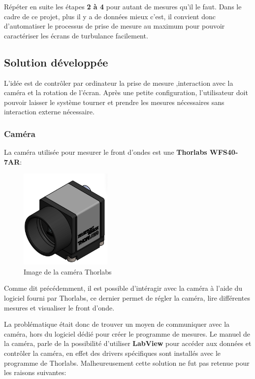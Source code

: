 Répéter en suite les étapes \textbf{2 à 4} pour autant de mesures qu'il le faut.
Dans le cadre de ce projet, plus il y a de données mieux c'est, il convient donc d'automatiser le
processus de prise de mesure au maximum pour pouvoir caractériser les écrans de turbulance facilement.

\subsection{Solution développée}
L'idée est de contrôler par ordinateur la prise de mesure ,interaction avec la caméra et la rotation de l'écran.
Après une petite configuration, l'utilisateur doit pouvoir laisser le système tourner et prendre les mesures nécessaires sans
interaction externe nécessaire.

\subsubsection{Caméra}

La caméra utilisée pour mesurer le front d'ondes est une \textbf{Thorlabs WFS40-7AR}:
\begin{figure}[H]
    \centering
    \includegraphics[width=0.4\textwidth]{assets/figures/ameliorations/thorlabs_40_7AR.png}
    \caption[Image de la caméra Thorlabs]{Image de la caméra Thorlabs \autocite{Camera_thorlabs_photo}}\label{fig:camera_thorlabs}
\end{figure}

Comme dit précédemment, il est possible d'intéragir avec la caméra à l'aide du logiciel fourni par Thorlabs, ce dernier permet de régler
la caméra, lire différentes mesures et visualiser le front d'onde.

La problématique était donc de trouver un moyen de communiquer avec la caméra, hors du logiciel dédié pour créer le programme de mesures.
Le manuel de la caméra, parle de la possibilité d'utiliser \textbf{LabView} pour accéder aux données et contrôler la caméra, en effet des
drivers spécifiques sont installés avec le programme de Thorlabs. Malheureusement cette solution ne fut pas retenue pour les raisons suivantes:

